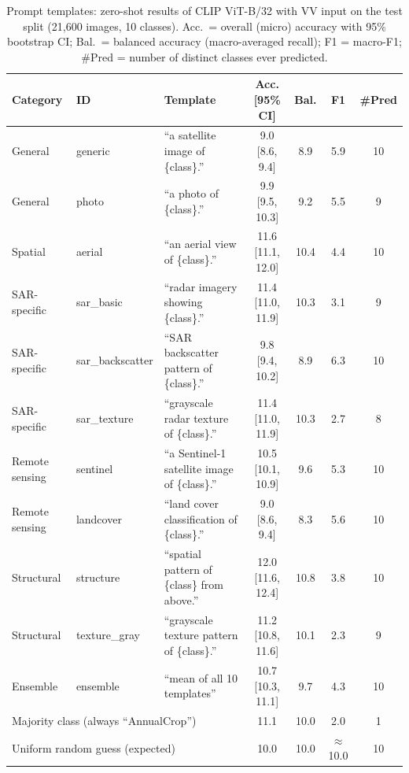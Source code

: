 \begin{table}[t]
\centering
\scriptsize
\caption{Prompt templates: zero-shot results of CLIP ViT-B/32 with VV input on the test split (21,600 images, 10 classes). Acc.\ = overall (micro) accuracy with 95\% bootstrap CI; Bal.\ = balanced accuracy (macro-averaged recall); F1 = macro-F1; \#Pred = number of distinct classes ever predicted.}
\label{tab:prompts}
\begin{tabular*}{\hsize}{@{\extracolsep{\fill}}lllcccc@{}}
\toprule
Category & ID & Template & Acc. [95\% CI] & Bal. & F1 & \#Pred \\
\midrule
General & generic & ``a satellite image of \{class\}.'' & 9.0 [8.6, 9.4] & 8.9 & 5.9 & 10 \\
General & photo & ``a photo of \{class\}.'' & 9.9 [9.5, 10.3] & 9.2 & 5.5 & 9 \\
Spatial & aerial & ``an aerial view of \{class\}.'' & 11.6 [11.1, 12.0] & 10.4 & 4.4 & 10 \\
SAR-specific & sar\_basic & ``radar imagery showing \{class\}.'' & 11.4 [11.0, 11.9] & 10.3 & 3.1 & 9 \\
SAR-specific & sar\_backscatter & ``SAR backscatter pattern of \{class\}.'' & 9.8 [9.4, 10.2] & 8.9 & 6.3 & 10 \\
SAR-specific & sar\_texture & ``grayscale radar texture of \{class\}.'' & 11.4 [11.0, 11.9] & 10.3 & 2.7 & 8 \\
Remote sensing & sentinel & ``a Sentinel-1 satellite image of \{class\}.'' & 10.5 [10.1, 10.9] & 9.6 & 5.3 & 10 \\
Remote sensing & landcover & ``land cover classification of \{class\}.'' & 9.0 [8.6, 9.4] & 8.3 & 5.6 & 10 \\
Structural & structure & ``spatial pattern of \{class\} from above.'' & 12.0 [11.6, 12.4] & 10.8 & 3.8 & 10 \\
Structural & texture\_gray & ``grayscale texture pattern of \{class\}.'' & 11.2 [10.8, 11.6] & 10.1 & 2.3 & 9 \\
Ensemble & ensemble & ``mean of all 10 templates'' & 10.7 [10.3, 11.1] & 9.7 & 4.3 & 10 \\
\midrule
\multicolumn{3}{l}{Majority class (always ``AnnualCrop'')} & 11.1 & 10.0 & 2.0 & 1 \\
\multicolumn{3}{l}{Uniform random guess (expected)} & 10.0 & 10.0 & $\approx$10.0 & 10 \\
\bottomrule
\end{tabular*}
\end{table}
